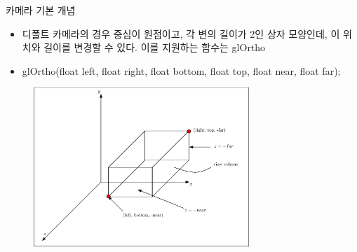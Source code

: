 \documentclass{beamer}
\begin{document}
\begin{frame}{카메라 기본 개념}

{\small
\begin{itemize}
\item 디폴트 카메라의 경우 중심이 원점이고, 각 변의 길이가 2인 상자 모양인데, 이 위치와 길이를 변경할 수 있다. 이를 지원하는 함수는 {\sf glOrtho}
\item glOrtho(float left, float right, float bottom, float top, float near, float far);
\end{itemize}
}

\begin{figure}
    \includegraphics[height=6cm]{OGL_camera/cameraViewVolume.eps}
\end{figure}

\end{frame}
\end{document}

